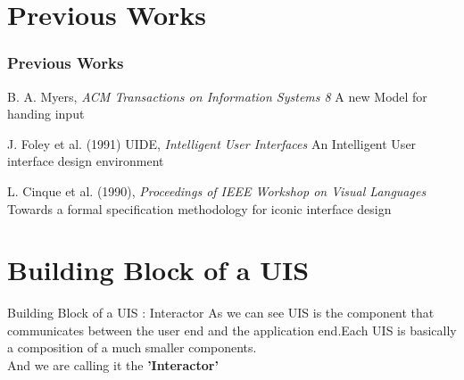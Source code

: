 \documentclass{beamer}
\begin{document}
	
	
	
	
	\section{Previous Works}
	\begin{frame}
		\frametitle{Previous Works}
		\begin{block}{B. A. Myers, \textit{ACM Transactions on Information Systems 8}}
			A new Model for handing input
		\end{block}
		
		\begin{block}{J. Foley et al. (1991) UIDE, \textit{Intelligent User Interfaces}}
			An Intelligent User interface design environment
		\end{block}
		
		\begin{block}{L. Cinque et al. (1990), \textit{Proceedings of IEEE Workshop on Visual Languages}}
			Towards a formal specification methodology for iconic interface design
		\end{block}
	\end{frame}


    	  	

\section{Building Block of a UIS}
\begin{frame}{Building Block of a UIS : Interactor}
	As we can see UIS is the component that communicates between the user end and the application end.Each UIS is basically a composition of a much smaller components.\\
	 And we are calling it the \textbf{'Interactor'}   
\end{frame}
\end{document}
